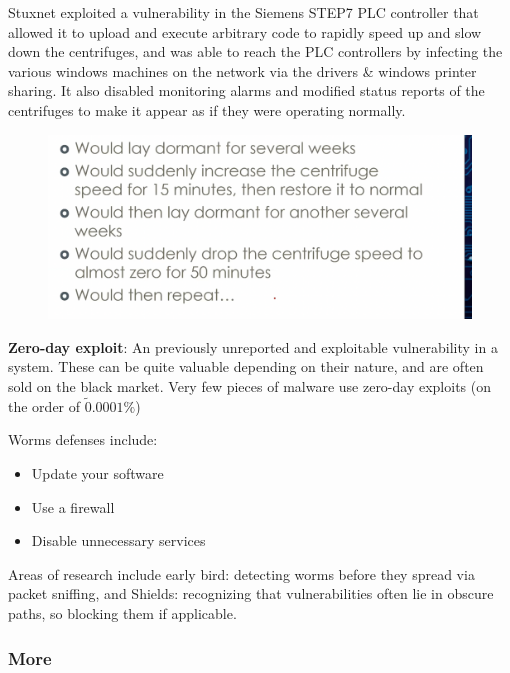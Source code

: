 \documentclass[../notes.tex]{subfiles}
\begin{document}
\begin{example}
    Stuxnet exploited a vulnerability in the Siemens STEP7 PLC controller that allowed it to upload and execute arbitrary code to rapidly speed up and slow down the centrifuges, and was able to reach the PLC controllers by infecting the various windows machines on the network via the drivers \& windows printer sharing.
    It also disabled monitoring alarms and modified status reports of the centrifuges to make it appear as if they were operating normally.

    \begin{figure}[H]
        \centering
        \includegraphics[width=0.8\linewidth]{img/image_2023-04-03-19-11-58.png}
    \end{figure}

\end{example}

\begin{definition}
    \textbf{Zero-day exploit}: An previously unreported and exploitable vulnerability in a system.
    These can be quite valuable depending on their nature, and are often sold on the black market.
    Very few pieces of malware use zero-day exploits (on the order of $ \tilde0.0001\% $)
\end{definition}

Worms defenses include:
\begin{itemize}
    \item Update your software
    \item Use a firewall
    \item Disable unnecessary services
\end{itemize}

Areas of research include early bird: detecting worms before they spread via packet sniffing, and Shields: recognizing that vulnerabilities often lie in obscure paths, so blocking them if applicable.


\subsubsection{More}
\end{document}
